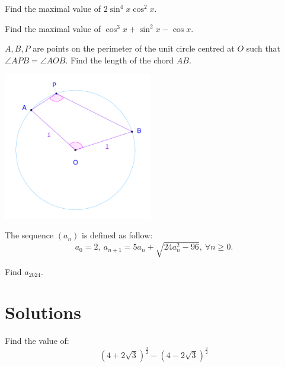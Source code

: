 \documentclass{article}
\begin{document}
\bigbreak

\begin{problem}
    Find the maximal value of $2\sin^4{x}\cos^2{x}.$

    Find the maximal value of $\cos^3{x} + \sin^2{x} - \cos{x}.$
\end{problem}

\bigbreak

\begin{problem}
    $A, B, P$ are points on the perimeter of the unit circle centred at $O$ such that $\angle APB = \angle AOB.$
    Find the length of the chord $AB.$
\end{problem}

\begin{center}
    \includegraphics[width=6.5cm]{./svg/pdf/23-24-sm2-s4-ct-p3-9.pdf}
\end{center}

\bigbreak

\begin{problem}
    The sequence $(a_n)$ is defined as follow:
    \[
        a_0 = 2,\ a_{n+1} = 5a_n + \sqrt{24a_n^2 - 96},\ \forall n \ge 0.
    \]
    
    Find $a_{2024}.$
\end{problem}

\newpage

\section{Solutions}

\begin{problem}
    Find the value of:
    \[
        \left(4 + 2\sqrt{3}\right)^{\frac{3}{2}} - \left(4 - 2\sqrt{3}\right)^{\frac{3}{2}}
    \]
\end{problem}
\end{document}
